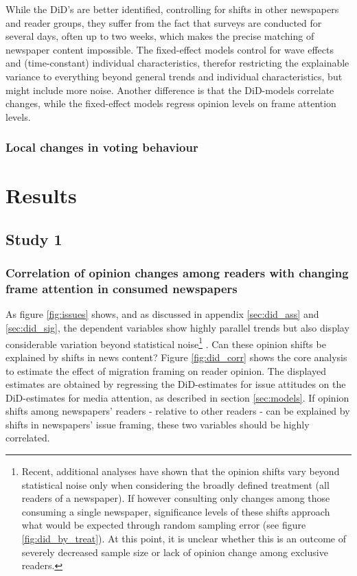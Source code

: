 \documentclass{article}
\begin{document}
While the DiD's are better identified, controlling for shifts in other newspapers and reader groups, they suffer from the fact that surveys are conducted for several days, often up to two weeks, which makes the precise matching of newspaper content impossible. The fixed-effect models control for wave effects and (time-constant) individual characteristics, therefor restricting the explainable variance to everything beyond general trends and individual characteristics, but might include more noise. Another difference is that the DiD-models correlate changes, while the fixed-effect models regress opinion levels on frame attention levels.

\subsubsection{Local changes in voting behaviour}



\section{Results}

\subsection{Study 1}

\subsubsection{Correlation of opinion changes among readers with changing frame attention in consumed newspapers}

As figure \ref{fig:issues} shows, and as discussed in appendix \ref{sec:did_ass} and \ref{sec:did_sig}, the dependent variables show highly parallel trends but also display considerable variation beyond statistical noise\footnote{Recent, additional analyses have shown that the opinion shifts vary beyond statistical noise only when considering the broadly defined treatment (all readers of a newspaper). If however consulting only changes among those consuming a single newspaper, significance levels of these shifts approach what would be expected through random sampling error (see figure \ref{fig:did_by_treat}). At this point, it is unclear whether this is an outcome of severely decreased sample size or lack of opinion change among exclusive readers.}
. Can these opinion shifts be explained by shifts in news content? Figure \ref{fig:did_corr} shows the core analysis to estimate the effect of migration framing on reader opinion. The displayed estimates are obtained by regressing the DiD-estimates for issue attitudes on the DiD-estimates for media attention, as described in section \ref{sec:models}. If opinion shifts among newspapers' readers - relative to other readers - can be explained by shifts in newspapers' issue framing, these two variables should be highly correlated.
\end{document}
